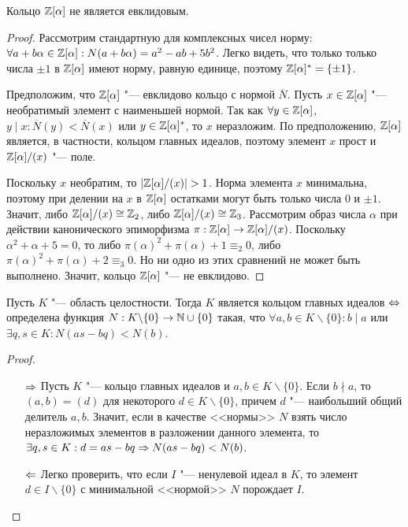 \begin{theorem}
	Кольцо $\mathbb{Z}[\alpha]$ не является евклидовым.
\end{theorem}

\begin{proof}
	Рассмотрим стандартную для комплексных чисел норму: $\forall a + b\alpha \hm\in \Z[\alpha]: N(a + b\alpha) \hm= a^2 - ab + 5b^2$. Легко видеть, что только только числа $\pm1$ в $\mathbb{Z}[\alpha]$ имеют норму, равную единице, поэтому $\mathbb{Z}[\alpha]^* = \{\pm1\}$.
		
	Предположим, что $\mathbb{Z}[\alpha]$ "--- евклидово кольцо с нормой $\overline{N}$. Пусть $x \in \mathbb{Z}[\alpha]$ "--- необратимый элемент с наименьшей нормой. Так как $\forall y \in \mathbb{Z}[\alpha]$, $y \mid x: \overline{N}(y) < \overline{N}(x)$ или $y \in \mathbb{Z}[\alpha]^*$, то $x$ неразложим. По предположению, $\mathbb{Z}[\alpha]$ является, в частности, кольцом главных идеалов, поэтому элемент $x$ прост и $\mathbb{Z}[\alpha] / (x)$ "--- поле.
	
	Поскольку $x$ необратим, то $|\mathbb{Z}[\alpha] / (x)| > 1$. Норма элемента $x$ минимальна, поэтому при делении на $x$ в $\mathbb{Z}[\alpha]$ остатками могут быть только числа $0$ и $\pm1$. Значит, либо $\mathbb{Z}[\alpha] / (x) \cong \mathbb{Z}_2$, либо $\mathbb{Z}[\alpha] / (x) \cong \mathbb{Z}_3$. Рассмотрим образ числа $\alpha$ при действии канонического эпиморфизма $\pi: \mathbb{Z}[\alpha] \to \mathbb{Z}[\alpha] / (x)$. Поскольку $\alpha^2 + \alpha + 5 = 0$, то либо $\pi(\alpha)^2 + \pi(\alpha) + 1 \equiv_2 0$, либо $\pi(\alpha)^2 + \pi(\alpha) + 2 \equiv_3 0$. Но ни одно из этих сравнений не может быть выполнено. Значит, кольцо $\mathbb{Z}[\alpha]$ "--- не евклидово.
\end{proof}

\begin{proposition}
	Пусть $K$ "--- область целостности. Тогда $K$ является кольцом главных идеалов $\Leftrightarrow$ определена функция $N: K\backslash\{0\} \to \mathbb{N} \cup \{0\}$ такая, что $\forall a, b \in K\backslash\{0\}: b \mid a$ или $\exists q, s \in K: N(as - bq) < N(b)$.
\end{proposition}

\begin{proof}~
	\begin{itemize}
		\item[$\Rightarrow$] Пусть $K$ "--- кольцо главных идеалов и $a, b \in K\backslash\{0\}$. Если $b \nmid a$, то $(a, b) = (d)$ для некоторого $d \in K\backslash\{0\}$, причем $d$ "--- наибольший общий делитель $a, b$. Значит, если в качестве <<нормы>> $N$ взять число неразложимых элементов в разложении данного элемента, то $\exists q, s \in K: d = as - bq \Rightarrow N(as - bq) < N(b)$.
		\item[$\Leftarrow$] Легко проверить, что если $I$ "--- ненулевой идеал в $K$, то элемент $d \in I \backslash \{0\}$ с минимальной <<нормой>> $N$ порождает $I$.\qedhere
	\end{itemize}
\end{proof}


